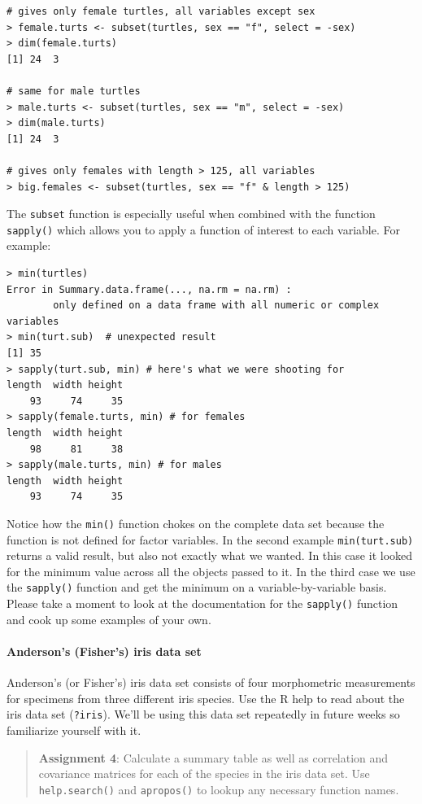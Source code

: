 \documentclass{article}
\begin{document}
\begin{lstlisting}
# gives only female turtles, all variables except sex
> female.turts <- subset(turtles, sex == "f", select = -sex)
> dim(female.turts)
[1] 24  3

# same for male turtles
> male.turts <- subset(turtles, sex == "m", select = -sex)
> dim(male.turts)
[1] 24  3

# gives only females with length > 125, all variables
> big.females <- subset(turtles, sex == "f" & length > 125)    
\end{lstlisting}
The \lstinline!subset! function is especially useful when combined with
the function \lstinline!sapply()! which allows you to apply a function
of interest to each variable. For example:

\begin{lstlisting}
> min(turtles)
Error in Summary.data.frame(..., na.rm = na.rm) : 
        only defined on a data frame with all numeric or complex variables
> min(turt.sub)  # unexpected result
[1] 35
> sapply(turt.sub, min) # here's what we were shooting for
length  width height 
    93     74     35
> sapply(female.turts, min) # for females
length  width height 
    98     81     38 
> sapply(male.turts, min) # for males
length  width height 
    93     74     35      
\end{lstlisting}
Notice how the \lstinline!min()! function chokes on the complete data
set because the function is not defined for factor variables. In the
second example \lstinline!min(turt.sub)! returns a valid result, but
also not exactly what we wanted. In this case it looked for the minimum
value across all the objects passed to it. In the third case we use the
\lstinline!sapply()! function and get the minimum on a
variable-by-variable basis. Please take a moment to look at the
documentation for the \lstinline!sapply()! function and cook up some
examples of your own.

\paragraph{Anderson's (Fisher's) iris data set}

Anderson's (or Fisher's) iris data set consists of four morphometric
measurements for specimens from three different iris species. Use the R
help to read about the iris data set (\lstinline!?iris!). We'll be using
this data set repeatedly in future weeks so familiarize yourself with
it.

\begin{quote}
\textbf{Assignment 4}: Calculate a summary table as well as correlation
and covariance matrices for each of the species in the iris data set.
Use \lstinline!help.search()! and \lstinline!apropos()! to lookup any
necessary function names.

\end{quote}
\end{document}
